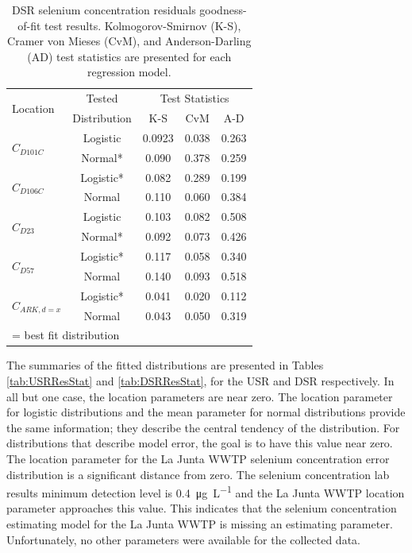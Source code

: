 \begin{linenumbers}
\begin{table}[htbp]
  \centering
  \caption[DSR selenium concentration residuals goodness-of-fit test results.]{DSR selenium concentration residuals goodness-of-fit test results.  Kolmogorov-Smirnov (K-S), Cramer von Mieses (CvM), and Anderson-Darling (AD) test statistics are presented for each regression model.}
    \begin{tabular}{lcccc}
    \toprule
    \multirow{2}{*}{Location}&Tested & \multicolumn{3}{c}{Test Statistics} \\ \cmidrule(r{.5em}l){3-5}
    &Distribution  & K-S   & CvM   & A-D \\
    \toprule
    \multirow{2}{*}{$ C_{D101C} $}			&Logistic	&0.0923	&0.038	&0.263	\\
    								&Normal*	&0.090	&0.378	&0.259	\\
    \midrule
    \multirow{2}{*}{$ C_{D106C} $}			&Logistic*	&0.082	&0.289	&0.199	\\
    								&Normal		&0.110	&0.060	&0.384	\\
    \midrule
    \multirow{2}{*}{$ C_{D23} $}		&Logistic	&0.103	&0.082	&0.508	\\
    								&Normal*	&0.092	&0.073	&0.426	\\
    \midrule
    \multirow{2}{*}{$ C_{D57} $}		&Logistic*	&0.117	&0.058	&0.340	\\
    								&Normal		&0.140	&0.093	&0.518	\\
	\midrule
    \multirow{2}{*}{$ C_{ARK,d=x} $}		&Logistic*	&0.041	&0.020	&0.112	\\
    								&Normal		&0.043	&0.050	&0.319	\\
    \bottomrule
    \multicolumn{5}{l}{\footnotesize * = best fit distribution}\\
    \end{tabular}%
  \label{tab:DSRGof}%
\end{table}%

The summaries of the fitted distributions are presented in Tables \ref{tab:USRResStat} and \ref{tab:DSRResStat}, for the USR and DSR respectively.  In all but one case, the location parameters are near zero.  The location parameter for logistic distributions and the mean parameter for normal distributions provide the same information; they describe the central tendency of the distribution.  For distributions that describe model error, the goal is to have this value near zero.  The location parameter for the La Junta WWTP selenium concentration error distribution is a significant distance from zero.  The selenium concentration lab results minimum detection level is \SI{0.4}{\micro\gram\per\liter} and the La Junta WWTP location parameter approaches this value.  This indicates that the selenium concentration estimating model for the La Junta WWTP is missing an estimating parameter.  Unfortunately, no other parameters were available for the collected data.


\end{linenumbers}
